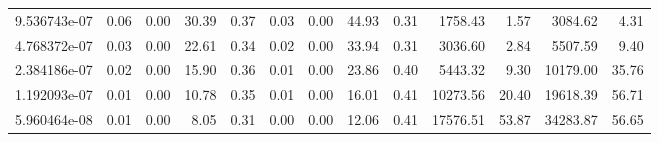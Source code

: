 \begin{tabular}{lrrrrrrrrrrrr}
9.536743e-07 &        0.06 &        0.00 &         30.39 &          0.37 &           0.03 &           0.00 &        44.93 &         0.31 &          1758.43 &             1.57 &         3084.62 &            4.31 \\
4.768372e-07 &        0.03 &        0.00 &         22.61 &          0.34 &           0.02 &           0.00 &        33.94 &         0.31 &          3036.60 &             2.84 &         5507.59 &            9.40 \\
2.384186e-07 &        0.02 &        0.00 &         15.90 &          0.36 &           0.01 &           0.00 &        23.86 &         0.40 &          5443.32 &             9.30 &        10179.00 &           35.76 \\
1.192093e-07 &        0.01 &        0.00 &         10.78 &          0.35 &           0.01 &           0.00 &        16.01 &         0.41 &         10273.56 &            20.40 &        19618.39 &           56.71 \\
5.960464e-08 &        0.01 &        0.00 &          8.05 &          0.31 &           0.00 &           0.00 &        12.06 &         0.41 &         17576.51 &            53.87 &        34283.87 &           56.65 \\
\bottomrule
\end{tabular}
